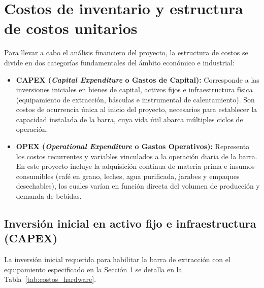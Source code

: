 \documentclass{article}
\begin{document}
\section{Costos de inventario y estructura de costos unitarios}

Para llevar a cabo el análisis financiero del proyecto, la estructura de costos se divide en dos categorías fundamentales del ámbito económico e industrial:

\begin{itemize}
	\item[$\bullet$] \textbf{CAPEX (\emph{Capital Expenditure} o Gastos de Capital):} Corresponde a las inversiones iniciales en bienes de capital, activos fijos e infraestructura física (equipamiento de extracción, básculas e instrumental de calentamiento). Son costos de ocurrencia única al inicio del proyecto, necesarios para establecer la capacidad instalada de la barra, cuya vida útil abarca múltiples ciclos de operación.
	
	\item[$\bullet$] \textbf{OPEX (\emph{Operational Expenditure} o Gastos Operativos):} Representa los costos recurrentes y variables vinculados a la operación diaria de la barra. En este proyecto incluye la adquisición continua de materia prima e insumos consumibles (café en grano, leches, agua purificada, jarabes y empaques desechables), los cuales varían en función directa del volumen de producción y demanda de bebidas.
\end{itemize}

\subsection{Inversión inicial en activo fijo e infraestructura (CAPEX)}

La inversión inicial requerida para habilitar la barra de extracción con el equipamiento especificado en la Sección 1 se detalla en la Tabla~\ref{tab:costos_hardware}.
\end{document}
